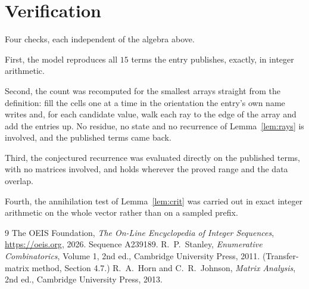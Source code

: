 \documentclass[11pt,a4paper]{article}
\theoremstyle{plain}
\theoremstyle{definition}
\begin{document}
\section{Verification}

Four checks, each independent of the algebra above.

First, the model reproduces all $15$ terms the entry publishes, exactly, in integer
arithmetic.

Second, the count was recomputed for the smallest arrays straight from the definition: fill the
cells one at a time in the orientation the entry's own name writes and, for each candidate
value, walk each ray to the edge of the array and add the entries up. No residue, no state and
no recurrence of Lemma~\ref{lem:rays} is involved, and the published terms came back.

Third, the conjectured recurrence was evaluated directly on the published terms, with no
matrices involved, and holds wherever the proved range and the data overlap.

Fourth, the annihilation test of Lemma~\ref{lem:crit} was carried out in exact integer
arithmetic on the whole vector rather than on a sampled prefix.

\begin{thebibliography}{9}
 The OEIS Foundation, \emph{The On-Line Encyclopedia of Integer
Sequences}, \url{https://oeis.org}, 2026. Sequence A239189.
 R.~P.~Stanley, \emph{Enumerative Combinatorics}, Volume 1, 2nd ed.,
Cambridge University Press, 2011. (Transfer-matrix method, Section 4.7.)
 R.~A.~Horn and C.~R.~Johnson, \emph{Matrix Analysis}, 2nd ed., Cambridge
University Press, 2013.
\end{thebibliography}
\end{document}
